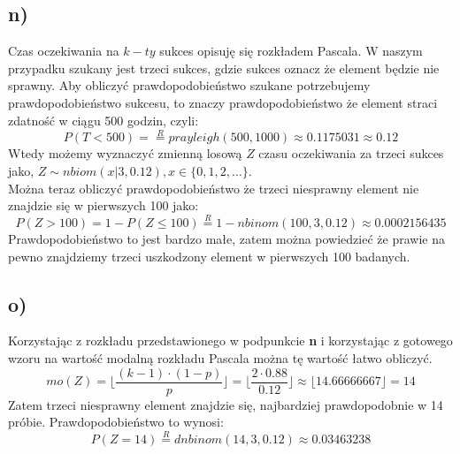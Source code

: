 \documentclass{article}
\begin{document}
\subsection{n)}
Czas oczekiwania na $k-ty$ sukces opisuję się rozkładem Pascala. W naszym przypadku szukany jest trzeci sukces, gdzie sukces oznacz że element będzie nie sprawny. Aby obliczyć prawdopodobieństwo szukane potrzebujemy prawdopodobieństwo sukcesu, to znaczy prawdopodobieństwo że element straci zdatność w ciągu 500 godzin, czyli:
\[ P(T<500) = \overset{R}{=} prayleigh(500,1000) \approx 0.1175031 \approx 0.12\]
Wtedy możemy wyznaczyć zmienną losową $Z$ czasu oczekiwania za trzeci sukces jako, $Z \sim nbiom(x|3,0.12), x \in \{0,1,2,\dots\}$. \\
Można teraz obliczyć prawdopodobieństwo że trzeci niesprawny element nie znajdzie się w pierwszych 100 jako:
\[P(Z > 100) = 1 - P(Z \leq 100) \overset{R}{=} 1 - nbinom(100, 3, 0.12) \approx 0.0002156435 \]
Prawdopodobieństwo to jest bardzo małe, zatem można powiedzieć że prawie na pewno znajdziemy trzeci uszkodzony element w pierwszych 100 badanych.

\subsection{o)}
Korzystając z rozkładu przedstawionego w podpunkcie \textbf{n} i korzystając z gotowego wzoru na wartość modalną rozkładu Pascala można tę wartość łatwo obliczyć.
\[ mo(Z) = \Big\lfloor \frac{(k-1)\cdot (1-p)}{p} \Big\rfloor = \Big\lfloor \frac{2\cdot 0.88}{0.12} \Big\rfloor \approx \lfloor 14.66666667 \rfloor= 14 \]
Zatem trzeci niesprawny element znajdzie się, najbardziej prawdopodobnie w 14 próbie. Prawdopodobieństwo to wynosi:
\[ P(Z = 14) \overset{R}{=} dnbinom(14, 3, 0.12) \approx 0.03463238 \]

\newpage
\end{document}
